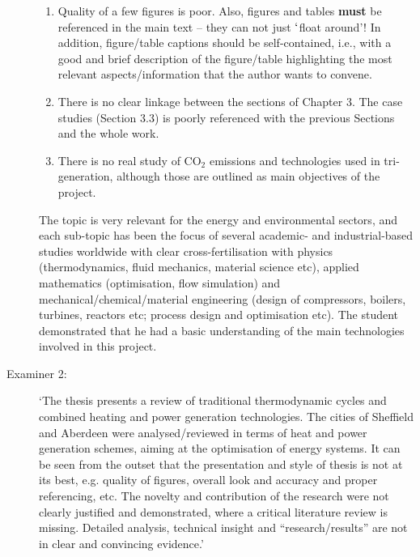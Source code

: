 \documentclass[14pt,twoside]{report}
\begin{document}
\begin{description}
\begin{enumerate}
%
\item Quality of a few figures is poor. Also, figures and tables {\bf must} be referenced in the main text -- they can not just $\lq$float around'! In addition, figure/table captions should be self-contained, i.e., with a good and brief description of the figure/table highlighting the most relevant aspects/information that the author wants to convene. 
% 
\item There is no clear linkage between the sections of Chapter 3. The case studies (Section 3.3) is poorly referenced with the previous Sections and the whole work.
%
\item There is no real study of CO$_{2}$ emissions and technologies used in tri-generation, although those are outlined as main objectives of the project.
%
\end{enumerate}

The topic is very relevant for the energy and environmental sectors, and each sub-topic has been the focus of several academic- and industrial-based studies worldwide with clear cross-fertilisation with physics (thermodynamics, fluid mechanics, material science etc), applied mathematics (optimisation, flow simulation) and mechanical/chemical/material engineering (design of compressors, boilers, turbines, reactors etc; process design and optimisation etc). The student demonstrated that he had a basic understanding of the main technologies involved in this project.

\item[Examiner 2:] `The thesis presents a review of traditional thermodynamic cycles and combined heating and power generation technologies. The cities of Sheffield and Aberdeen were analysed/reviewed in terms of heat and power generation schemes, aiming at the optimisation of energy systems. It can be seen from the outset that the presentation and style of thesis is not at its best, e.g. quality of figures, overall look and accuracy and proper referencing, etc. The novelty and contribution of the research were not clearly justified and demonstrated, where a critical literature review is missing. Detailed analysis, technical insight and “research/results” are not in clear and convincing evidence.'

\end{description}

\clearpage



\end{document}
